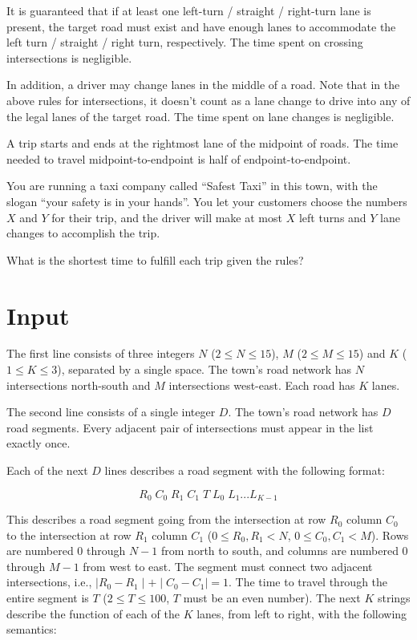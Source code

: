 It is guaranteed that if at least one left-turn / straight / right-turn lane is present, the target road must exist and have enough lanes to accommodate the left turn / straight / right turn, respectively. The time spent on crossing intersections is negligible.

In addition, a driver may change lanes in the middle of a road. Note that in the above rules for intersections, it doesn't count as a lane change to drive into any of the legal lanes of the target road. The time spent on lane changes is negligible.

A trip starts and ends at the rightmost lane of the midpoint of roads. The time needed to travel midpoint-to-endpoint is half of endpoint-to-endpoint.

You are running a taxi company called ``Safest Taxi'' in this town, with the slogan ``your safety is in your hands''. You let your customers choose the numbers $X$ and $Y$ for their trip, and the driver will make at most $X$ left turns and $Y$ lane changes to accomplish the trip.

What is the shortest time to fulfill each trip given the rules?

\section*{Input}

The first line consists of three integers $N$ ($2 \leq N \leq 15$), $M$ ($2 \leq M \leq 15$) and $K$ ($1 \leq K \leq 3$), separated by a single space. The town's road network has $N$ intersections north-south and $M$ intersections west-east. Each road has $K$ lanes.

The second line consists of a single integer $D$. The town's road network has $D$ road segments. Every adjacent pair of intersections must appear in the list exactly once.

Each of the next $D$ lines describes a road segment with the following format:

$$R_0\;C_0\;R_1\;C_1\;T\;L_0\;L_1 ... L_{K-1}$$

This describes a road segment going from the intersection at row $R_0$ column $C_0$ to the intersection at row $R_1$ column $C_1$ ($0 \leq R_0,R_1<N$, $0 \leq C_0,C_1<M$). Rows are numbered $0$ through $N-1$ from north to south, and columns are numbered $0$ through $M-1$ from west to east. The segment must connect two adjacent intersections, i.e., $\mid R_0 - R_1 \mid + \mid C_0 - C_1\mid  = 1$. The time to travel through the entire segment is $T$ ($2 \leq T \leq 100$, $T$ must be an even number). The next $K$ strings describe the function of each of the $K$ lanes, from left to right, with the following semantics:\vspace{.5em}

